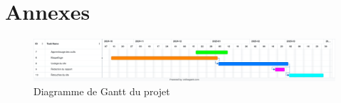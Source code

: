 \appendix
\renewcommand{\thefigure}{\Alph{figure}}

\chapter*{Annexes}
\pagebreak

\begin{figure}
    \centering
    \includegraphics[width=\textwidth]{assets/pictures/gantt.png}
    \caption{Diagramme de Gantt du projet}
    \label{anx:gantt}
\end{figure}
